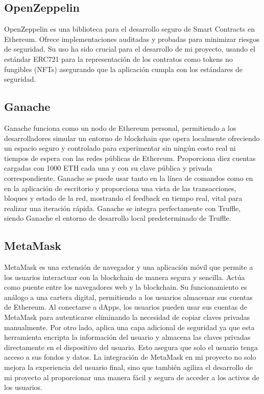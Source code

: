 \subsection{OpenZeppelin}

OpenZeppelin es una biblioteca para el desarrollo seguro de Smart Contracts en Ethereum. Ofrece implementaciones auditadas y probadas para minimizar riesgos de seguridad.
Su uso ha sido crucial para el desarrollo de mi proyecto, usando el estándar ERC721 para la representación de los contratos como tokens no fungibles (NFTs) asegurando que la aplicación cumpla con los estándares de seguridad.


\subsection{Ganache}

Ganache funciona como un nodo de Ethereum personal, permitiendo a los desarrolladores simular un entorno de blockchain que opera localmente ofreciendo un espacio seguro y controlado para experimentar sin ningún costo real ni tiempos de espera con las redes públicas de Ethereum.
Proporciona diez cuentas cargadas con 1000 ETH cada una y con su clave pública y privada correspondiente.
Ganache se puede usar tanto en la línea de comandos como en en la aplicación de escritorio y proporciona  una vista de las transacciones, bloques y estado de la red, mostrando el feedback en tiempo real, vital para realizar una iteración rápida.
Ganache se integra perfectamente con Truffle, siendo Ganache el entorno de desarrollo local predeterminado de Truffle.


\subsection{MetaMask}

MetaMask es una extensión de navegador y una aplicación móvil que permite a los usuarios interactuar con la blockchain de manera segura y sencilla. Actúa como puente entre los navegadores web y la blockchain.
Su funcionamiento es análogo a una cartera digital, permitiendo a los usuarios almacenar sus cuentas de Ethereum.
Al conectarse a dApps, los usuarios pueden usar sus cuentas de MetaMask para autenticarse eliminando la necesidad de copiar claves privadas manualmente. Por otro lado, aplica una capa adicional de seguridad ya que esta herramienta encripta la información del usuario y almacena las claves privadas directamente en el dispositivo del usuario. Esto asegura que solo el usuario tenga acceso a sus fondos y datos.
La integración de MetaMask en mi proyecto no solo mejora la experiencia del usuario final, sino que también agiliza el desarrollo de mi proyecto al proporcionar una manera fácil y segura de acceder a los activos de los usuarios.


